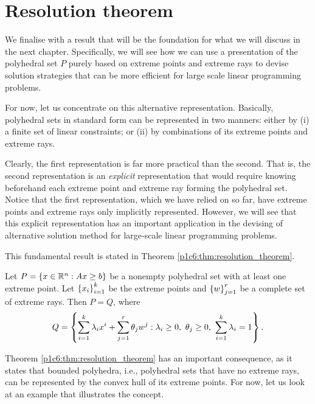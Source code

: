 \section{Resolution theorem}

We finalise with a result that will be the foundation for what we will discuss in the next chapter. Specifically, we will see how we can use a presentation of the polyhedral set $P$ purely based on extreme points and extreme rays to devise solution strategies that can be more efficient for large scale linear programming problems. 

For now, let us concentrate on this alternative representation. Basically, polyhedral sets in standard form can be represented in two manners: either by (i) a finite set of linear constraints; or (ii) by combinations of its extreme points and extreme rays.

Clearly, the first representation is far more practical than the second. That is, the second representation is an \emph{explicit} representation that would require knowing beforehand each extreme point and extreme ray forming the polyhedral set. Notice that the first representation, which we have relied on so far, have extreme points and extreme rays only implicitly represented. However, we will see that this explicit representation has an important application in the devising of alternative solution method for large-scale linear programming problems.

This fundamental result is stated in Theorem \ref{p1c6:thm:resolution_theorem}. 

\begin{theorem}\label{p1c6:thm:resolution_theorem}
	Let $P = \left\{ x \in \mathbb{R}^n : Ax \geq b \right \}$ be a nonempty polyhedral set with at least one extreme point. Let $\left\{ x_i \right \}_{i=1}^k$ be the extreme points and $\left\{ w \right \}_{j=1}^r$ be a complete set of extreme rays. Then $P = Q$, where 
	\begin{equation*}
		Q = \braces{\sum_{i=1}^k \lambda_i x^i + \sum_{j=1}^r \theta_jw^j : \lambda_i \geq 0, \ \theta_j \geq 0, \ \sum_{i=1}^k \lambda_i =1}.
	\end{equation*}
\end{theorem}


Theorem \ref{p1c6:thm:resolution_theorem} has an important consequence, as it states that bounded polyhedra, i.e., polyhedral sets that have no extreme rays, can be represented by the convex hull of its extreme points. For now, let us look at an example that illustrates the concept.

